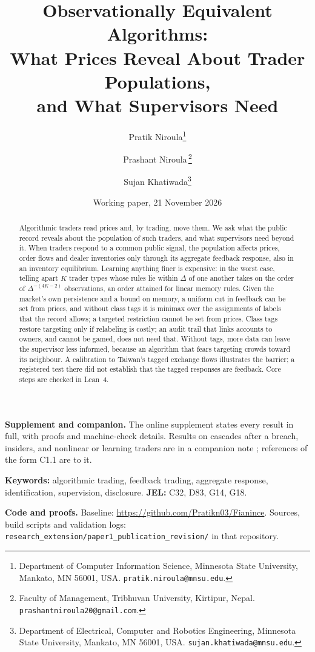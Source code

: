 \documentclass[12pt]{article}
\title{Observationally Equivalent Algorithms:\\ What Prices Reveal About Trader Populations,\\ and What Supervisors Need}
\author{Pratik Niroula\thanks{Department of Computer Information Science, Minnesota State University, Mankato, MN 56001, USA. \texttt{pratik.niroula@mnsu.edu}.}
\and Prashant Niroula\,\thanks{Faculty of Management, Tribhuvan University, Kirtipur, Nepal. \texttt{prashantniroula20@gmail.com}.}
\and Sujan Khatiwada\thanks{Department of Electrical, Computer and Robotics Engineering, Minnesota State University, Mankato, MN 56001, USA. \texttt{sujan.khatiwada@mnsu.edu}.}}
\date{Working paper, 21 November 2026}
\theoremstyle{definition}
\theoremstyle{remark}
\begin{document}
\maketitle
\thispagestyle{empty}\pagestyle{empty}
\begingroup\singlespacing\small

\begin{abstract}
\noindent Algorithmic traders read prices and, by trading, move them. We ask what the public record reveals about the population of such traders, and what supervisors need beyond it. When traders respond to a common public signal, the population affects prices, order flows and dealer inventories only through its aggregate feedback response, also in an inventory equilibrium. Learning anything finer is expensive: in the worst case, telling apart $K$ trader types whose rules lie within $\Delta$ of one another takes on the order of $\Delta^{-(4K-2)}$ observations, an order attained for linear memory rules. Given the market's own persistence and a bound on memory, a uniform cut in feedback can be set from prices, and without class tags it is minimax over the assignments of labels that the record allows; a targeted restriction cannot be set from prices. Class tags restore targeting only if relabeling is costly; an audit trail that links accounts to owners, and cannot be gamed, does not need that. Without tags, more data can leave the supervisor less informed, because an algorithm that fears targeting crowds toward its neighbour. A calibration to Taiwan's tagged exchange flows illustrates the barrier; a registered test there did not establish that the tagged responses are feedback. Core steps are checked in Lean~4.
\end{abstract}

\noindent\textbf{Supplement and companion.} The online supplement states every result in full, with proofs and machine-check details. Results on cascades after a breach, insiders, and nonlinear or learning traders are in a companion note \citep{niroula2026c}; references of the form C1.1 are to it.

\noindent\textbf{Keywords:} algorithmic trading, feedback trading, aggregate response, identification, supervision, disclosure. \textbf{JEL:} C32, D83, G14, G18.

\noindent\textbf{Code and proofs.} Baseline: \url{https://github.com/Pratikn03/Fianince}. Sources, build scripts and validation logs: \nolinkurl{research_extension/paper1_publication_revision/} in that repository.

\endgroup
\newpage
\pagestyle{fancy}
\setcounter{page}{1}
\end{document}
